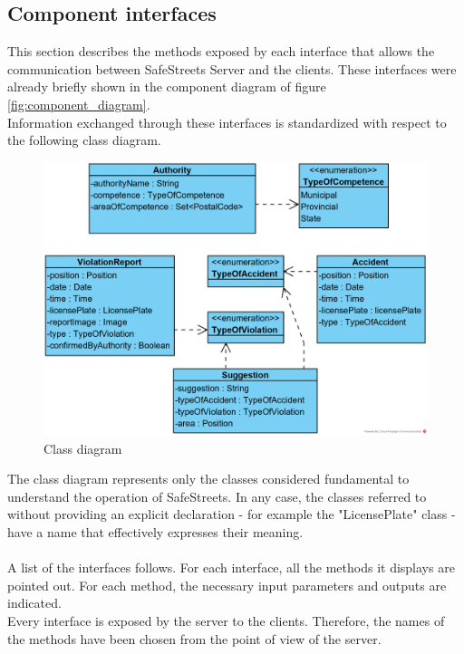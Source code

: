 \documentclass{article}
\begin{document}
		\clearpage
		\subsection{Component interfaces}
		This section describes the methods exposed by each interface that allows the communication between SafeStreets Server and the clients. These interfaces were already briefly shown in the component diagram of figure \ref{fig:component_diagram}.\\
		Information exchanged through these interfaces is standardized with respect to the following class diagram.\\
		
		\begin{figure}[H]
			\centering
			\includegraphics [width=\textwidth]{diagrams/class_diagram.png}
			\caption[Class diagram]{Class diagram}
			\label{fig:class_diagram}
		\end{figure}
	
		The class diagram represents only the classes considered fundamental to understand the operation of SafeStreets. In any case, the classes referred to without providing an explicit declaration - for example the "LicensePlate" class - have a name that effectively expresses their meaning.\\
		\\
		A list of the interfaces follows. For each interface, all the methods it displays are pointed out. For each method, the necessary input parameters and outputs are indicated.\\
		Every interface is exposed by the server to the clients. Therefore, the names of the methods have been chosen from the point of view of the server.\\
		
\end{document}

